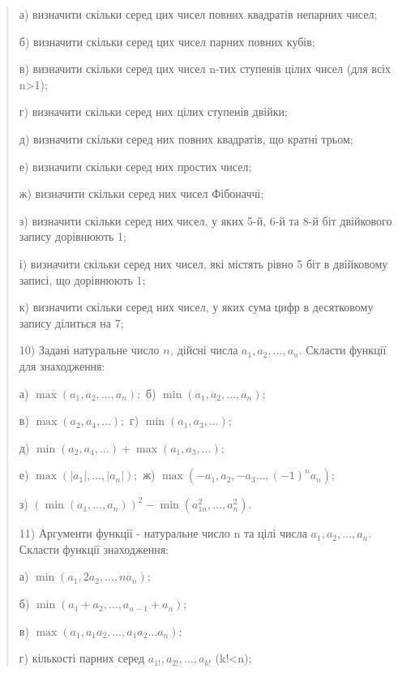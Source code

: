 \documentclass[]{article}
\begin{document}
\begin{quote}
а) визначити скільки серед цих чисел повних квадратів непарних чисел;

б) визначити скільки серед цих чисел парних повних кубів;

в) визначити скільки серед цих чисел n-тих ступенів цілих чисел (для
всіх n\textgreater{}1);

г) визначити скільки серед них цілих ступенів двійки;

д) визначити скільки серед них повних квадратів, що кратні трьом;

е) визначити скільки серед них простих чисел;

ж) визначити скільки серед них чисел Фібоначчі;

з) визначити скільки серед них чисел, у яких 5-й, 6-й та 8-й біт
двійкового запису дорівнюють 1;

і) визначити скільки серед них чисел, які містять рівно 5 біт в
двійковому записі, що дорівнюють 1;

к) визначити скільки серед них чисел, у яких сума цифр в десятковому
запису ділиться на 7;

10) Задані натуральне число \(n\)\emph{,} дійсні числа
\(a_{1},a_{2},\ldots,a_{n}.\) Скласти функції для знаходження:

а) \(\max\left( a_{1},a_{2},\ldots,a_{n} \right);\) б)
\(\min\left( a_{1},a_{2},\ldots,a_{n} \right);\)

в) \(\max\left( a_{2},a_{4},\ldots \right);\) г)
\(\min\left( a_{1},a_{3},\ldots \right);\)

д)
\(\min\left( a_{2},a_{4},\ldots \right) + \max\left( a_{1},a_{3},\ldots \right);\)

е)
\(\max\left( \left| a_{1} \right|,\ldots,\left| a_{n} \right| \right);\)
ж) \(\max\left( - a_{1},a_{2}, - a_{3}\ldots,( - 1)^{n}a_{n} \right);\)

з)
\(\left( \min\left( a_{1},\ldots,a_{n} \right) \right)^{2} - \min\left( a_{1n}^{2},\ldots,a_{n}^{2} \right).\)

11) Аргументи функції - натуральне число n та цілі числа
\(a_{1},a_{2},\ldots,a_{n}.\) Скласти функції знаходження:

а) \(\min\left( a_{1},2a_{2},\ldots,na_{n} \right);\)

б) \(\min\left( a_{1} + a_{2},\ldots,a_{n - 1} + a_{n} \right);\)

в)
\(\max\left( a_{1},a_{1}a_{2},\ldots,a_{1}a_{2}\ldots a_{n} \right);\)

г) кількості парних серед \(a_{1!},a_{2!},\ldots,a_{k!}\)
(k!\textless{}n);


\end{quote}
\end{document}
